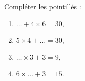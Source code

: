 
\begin{exercice}\label{exosmath-0730}

Compléter les pointillés :
\begin{multicols}{2}
    \begin{enumerate}
        \item
            \( \ldots+4\times 6=30\),
        \item
            \( 5\times 4+\ldots=30\),
        \item
            \( \ldots\times 3+3=9\),
        \item
            \( 6\times \ldots+3=15\).
    \end{enumerate}
\end{multicols}

\end{exercice}
